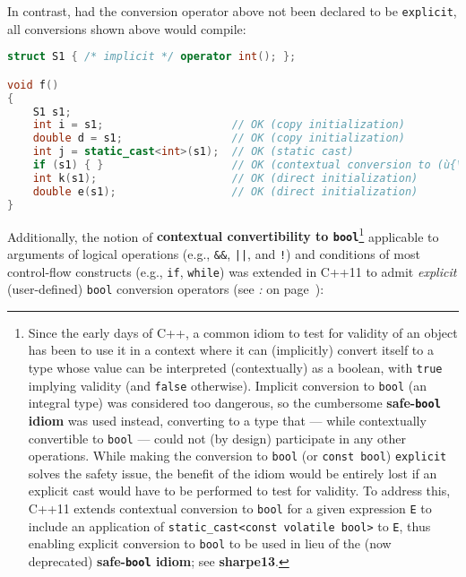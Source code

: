 \noindent In contrast, had the conversion operator above not been declared to be
\texttt{explicit}, all conversions shown above would compile:

\begin{lstlisting}[language=C++]
struct S1 { /* implicit */ operator int(); };

void f()
{
    S1 s1;
    int i = s1;                    // OK (copy initialization)
    double d = s1;                 // OK (copy initialization)
    int j = static_cast<int>(s1);  // OK (static cast)
    if (s1) { }                    // OK (contextual conversion to (ù{\codeincomments{bool}}ù))
    int k(s1);                     // OK (direct initialization)
    double e(s1);                  // OK (direct initialization)
}
\end{lstlisting}

\noindent Additionally, the notion of \textbf{contextual convertibility to
\texttt{bool}}{\cprotect\footnote{Since the early days of C++, a common
  idiom to test for validity of an object has been to use it in a
  context where it can (implicitly) convert itself to a type whose value
  can be interpreted (contextually) as a boolean, with \texttt{true}
  implying validity (and \texttt{false} otherwise). Implicit conversion
  to \texttt{bool} (an integral type) was considered too dangerous,
  so the cumbersome \textbf{safe-\texttt{bool} idiom} was used instead,
  converting to a type that --- while contextually convertible to
  \texttt{bool} --- could not (by design) participate in any other
  operations. While making the conversion to \texttt{bool} (or
  \texttt{const}~\texttt{bool}) \texttt{explicit} solves the safety
  issue, the benefit of the idiom would be entirely lost if an explicit
  cast would have to be performed to test for validity. To address this,
  C++11 extends contextual conversion to \texttt{bool} for a given
  expression \texttt{E} to include an application of
  \texttt{static\_cast<const}~\texttt{volatile}~\texttt{bool>} to
  \texttt{E}, thus enabling explicit conversion to \texttt{bool} to be
  used in lieu of the (now deprecated) \textbf{safe-\texttt{bool} idiom}; see
  \textbf{{sharpe13}}.}} applicable to arguments of logical operations
(e.g., \texttt{\&\&}, \texttt{||}, and \texttt{!}) and conditions of
most control-flow constructs (e.g., \texttt{if}, \texttt{while}) was
extended in C++11 to admit \emph{explicit} (user-defined) \texttt{bool}
conversion operators (see {\it{}: } on page~\pageref{enabling-contextual-conversions-to-bool-as-a-test-for-validity}):

